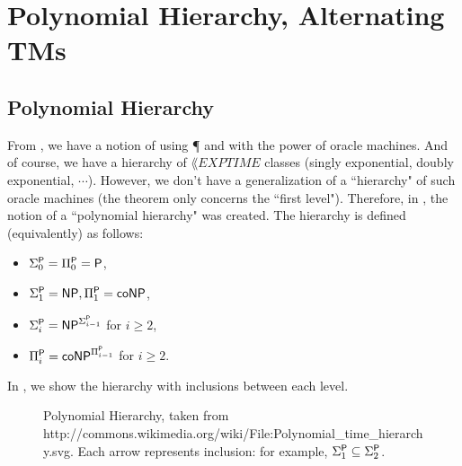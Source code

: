 \section{Polynomial Hierarchy, Alternating TMs}

\subsection{Polynomial Hierarchy}

From , we have a notion of using {\P} and {\NP} with the power of oracle machines. And of course, we have a hierarchy of $\lang{EXPTIME}$ classes (singly exponential, doubly exponential, $\cdots$). However, we don't have a generalization of a ``hierarchy" of such oracle machines (the theorem only concerns the ``first level"). Therefore, in \cite{originalpolyhierarchypaper}, the notion of a ``polynomial hierarchy" was created. The hierarchy is defined (equivalently) as follows:
\begin{itemize}
\item $\Sigma_0^\P = \Pi_0^\P = \P$,
\item $\Sigma_1^\P = \NP, \Pi_1^\P = \coNP$,
\item $\Sigma_i^\P = \NP^{\Sigma_{i-1}^\P}$ for $i \ge 2$, 
\item $\Pi_i^\P = \coNP^{\Pi_{i-1}^\P}$ for $i \ge 2$.
\end{itemize}
In , we show the hierarchy with inclusions between each level. 
\begin{figure}[!htb]
\centering
{}
\caption{Polynomial Hierarchy, taken from http://commons.wikimedia.org/wiki/File:Polynomial\_time\_hierarchy.svg. Each arrow represents inclusion: for example, $\Sigma_1^\P \subseteq \Sigma_2^\P$.}
\label{fig:polyhierarchy}
\end{figure}

